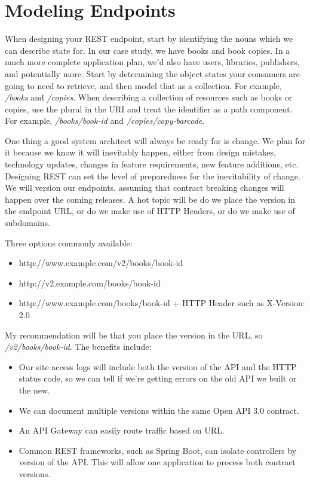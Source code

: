 \section{Modeling Endpoints}

When designing your REST endpoint, start by identifying the nouns which we can describe state for.  In our case study, we have books and book copies.  In a much more complete application plan, we'd also have users, libraries, publishers, and potentially more.  Start by determining the object states your consumers are going to need to retrieve, and then model that as a collection.  For example, \textit{/books} and \textit{/copies}.  When describing a collection of resources such as books or copies, use the plural in the URI and treat the identifier as a path component.  For example, \textit{/books/book-id} and \textit{/copies/copy-barcode}.

One thing a good system architect will always be ready for is change.  We plan for it because we know it will inevitably happen, either from design mistakes, technology updates, changes in feature requirements, new feature additions, etc.  Designing REST can set the level of preparedness for the inevitability of change.  We will version our endpoints, assuming that contract breaking changes will happen over the coming releases.  A hot topic will be do we place the version in the endpoint URL, or do we make use of HTTP Headers, or do we make use of subdomains.

Three options commonly available:

\begin{itemize}
  \item http://www.example.com/v2/books/book-id
  \item http://v2.example.com/books/book-id
  \item http://www.example.com/books/book-id + HTTP Header such as X-Version: 2.0
\end{itemize}

My recommendation will be that you place the version in the URL, so \textit{/v2/books/book-id}.  The benefits include:
\begin{itemize}
  \item Our site access logs will include both the version of the API and the HTTP status code, so we can tell if we're getting errors on the old API we built or the new.
  \item We can document multiple versions within the same Open API 3.0 contract.
  \item An API Gateway can easily route traffic based on URL.
  \item Common REST frameworks, such as Spring Boot, can isolate controllers by version of the API.  This will allow one application to process both contract versions.
\end{itemize}


